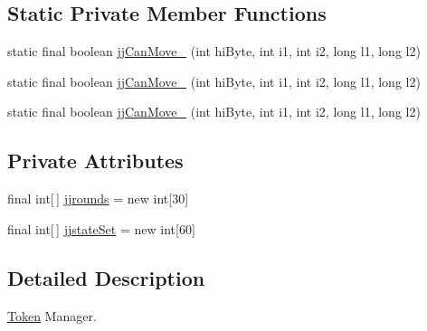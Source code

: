 \subsection*{Static Private Member Functions}
\begin{DoxyCompactItemize}
\item 
static final boolean \hyperlink{classorg_1_1coode_1_1owlapi_1_1functionalparser_1_1_o_w_l_functional_syntax_parser_token_manager_a1677ccd03b9addfd474945bc781141eb}{jj\-Can\-Move\-\_} (int hi\-Byte, int i1, int i2, long l1, long l2)
\item 
static final boolean \hyperlink{classorg_1_1coode_1_1owlapi_1_1functionalparser_1_1_o_w_l_functional_syntax_parser_token_manager_a897fd093cabe5882a34e3036c6bc17eb}{jj\-Can\-Move\-\_} (int hi\-Byte, int i1, int i2, long l1, long l2)
\item 
static final boolean \hyperlink{classorg_1_1coode_1_1owlapi_1_1functionalparser_1_1_o_w_l_functional_syntax_parser_token_manager_a081b4d8862ba8551429ecfe4c6c1fe92}{jj\-Can\-Move\-\_} (int hi\-Byte, int i1, int i2, long l1, long l2)
\end{DoxyCompactItemize}
\subsection*{Private Attributes}
\begin{DoxyCompactItemize}
\item 
final int\mbox{[}$\,$\mbox{]} \hyperlink{classorg_1_1coode_1_1owlapi_1_1functionalparser_1_1_o_w_l_functional_syntax_parser_token_manager_a6c209c924b7ce72bc6255d80d5a0dd47}{jjrounds} = new int\mbox{[}30\mbox{]}
\item 
final int\mbox{[}$\,$\mbox{]} \hyperlink{classorg_1_1coode_1_1owlapi_1_1functionalparser_1_1_o_w_l_functional_syntax_parser_token_manager_a53f4698c078268ba9dc6944f38896d6f}{jjstate\-Set} = new int\mbox{[}60\mbox{]}
\end{DoxyCompactItemize}


\subsection{Detailed Description}
\hyperlink{classorg_1_1coode_1_1owlapi_1_1functionalparser_1_1_token}{Token} Manager. 


